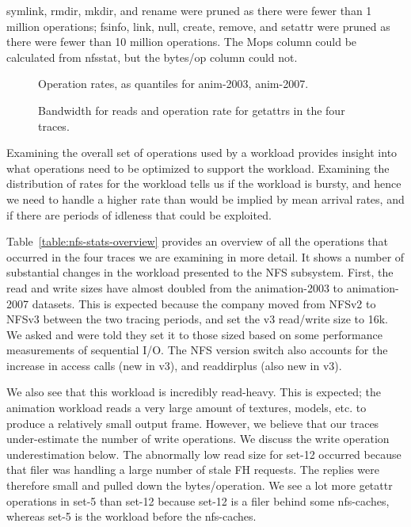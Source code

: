 \begin{table*}
\caption{symlink, rmdir, mkdir, and rename were pruned as there were
fewer than 1 million operations; fsinfo, link, null, create, remove,
and setattr were pruned as there were fewer than 10 million
operations.  The Mops column could be calculated from nfsstat, but the
bytes/op column could not.}

\label{table:nfs-stats-overview}
\end{table*}

\begin{figure*}
\caption{Operation rates, as quantiles for anim-2003, anim-2007.}
\label{fig:oprates}
\end{figure*}

\begin{figure*}
\caption{Bandwidth for reads and operation rate for getattrs in the four traces.}
\label{fig:bw-ops-quantiles}
\end{figure*}

Examining the overall set of operations used by a workload provides
insight into what operations need to be optimized to support the
workload.  Examining the distribution of rates for the workload tells
us if the workload is bursty, and hence we need to handle a higher
rate than would be implied by mean arrival rates, and if there are
periods of idleness that could be exploited.

Table~\ref{table:nfs-stats-overview} provides an overview of all the
operations that occurred in the four traces we are examining in more
detail.  It shows a number of substantial changes in the workload
presented to the NFS subsystem.  First, the read and write sizes have
almost doubled from the animation-2003 to animation-2007 datasets.  This is expected
because the company moved from NFSv2 to NFSv3 between the two
tracing periods, and set the v3 read/write size to 16k.  We asked and
were told they set it to those sized based on some performance
measurements of sequential I/O.  The NFS version switch also accounts
for the increase in access calls (new in v3), and readdirplus (also
new in v3).  

We also see that this workload is incredibly read-heavy.  This is
expected; the animation workload reads a very large amount of
textures, models, etc. to produce a relatively small output frame.
However, we believe that our traces under-estimate the number of write
operations.  We discuss the write operation underestimation below.
The abnormally low read size for set-12 occurred because
that filer was handling a large number of stale FH requests.  The
replies were therefore small and pulled down the bytes/operation.  We
see a lot more getattr operations in set-5 than set-12 because set-12
is a filer behind some nfs-caches, whereas set-5 is the workload
before the nfs-caches.

